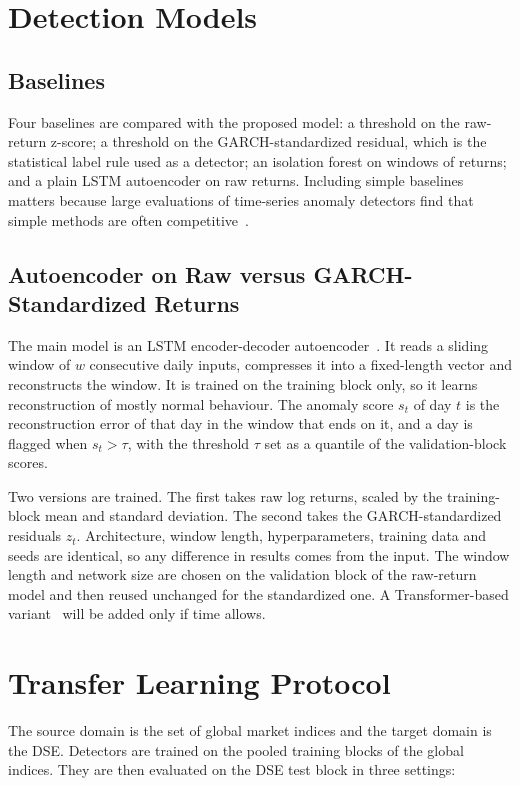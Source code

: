 \section{Detection Models}

\subsection{Baselines}
Four baselines are compared with the proposed model: a threshold on the raw-return z-score;
a threshold on the GARCH-standardized residual, which is the statistical label rule used as
a detector; an isolation forest on windows of returns; and a plain LSTM autoencoder on raw
returns. Including simple baselines matters because large evaluations of time-series anomaly
detectors find that simple methods are often competitive~\cite{schmidl2022anomaly}.

\subsection{Autoencoder on Raw versus GARCH-Standardized Returns}
The main model is an LSTM encoder-decoder autoencoder~\cite{malhotra2016lstm}. It reads a
sliding window of $w$ consecutive daily inputs, compresses it into a fixed-length vector and
reconstructs the window. It is trained on the training block only, so it learns
reconstruction of mostly normal behaviour. The anomaly score $s_t$ of day $t$ is the
reconstruction error of that day in the window that ends on it, and a day is flagged when
$s_t > \tau$, with the threshold $\tau$ set as a quantile of the validation-block scores.

Two versions are trained. The first takes raw log returns, scaled by the training-block mean
and standard deviation. The second takes the GARCH-standardized residuals $z_t$. Architecture,
window length, hyperparameters, training data and seeds are identical, so any difference in
results comes from the input. The window length and network size are chosen on the
validation block of the raw-return model and then reused unchanged for the standardized one.
A Transformer-based variant~\cite{xu2022anomaly} will be added only if time allows.

\section{Transfer Learning Protocol}
The source domain is the set of global market indices and the target domain is the DSE.
Detectors are trained on the pooled training blocks of the global indices. They are then
evaluated on the DSE test block in three settings:

